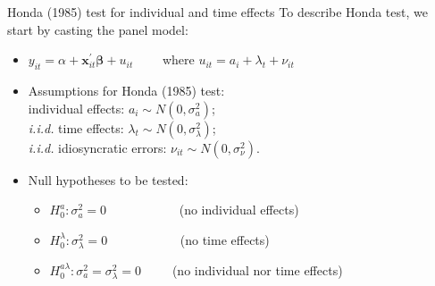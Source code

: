 \documentclass[usenames,dvipsnames]{beamer}
\begin{document}
\begin{frame}{Honda (1985) test for individual and time effects}
To describe Honda test, we start by casting the panel model: \\ \bigskip
\begin{itemize}
    \item $y_{it} = \alpha + \bm{x}^{\prime}_{it} \bm{\beta} + u_{it} \qquad$    where $u_{it}=a_i + \lambda_t + \nu_{it}$
    \bigskip
    \item Assumptions for Honda (1985) test: \\  individual effects: $a_i \sim N(0,\sigma^2_{a})$; \\{\it i.i.d.} time effects: $\lambda_t \sim N(0,\sigma^2_{\lambda})$; \\{\it i.i.d.} idiosyncratic errors: $\nu_{it} \sim N(0,\sigma^2_{\nu})$.
    \bigskip
    \item Null hypotheses to be tested:
    \medskip
    \begin{itemize}
        \item $H_0^{a}: \sigma^2_{a} = 0 \qquad \qquad$ ~~~(no individual effects)
        \smallskip
        \item $H_0^{\lambda}: \sigma^2_{\lambda} = 0 \qquad \qquad$ ~~~(no time effects)
        \smallskip
        \item $H_0^{a \lambda}: \sigma^2_{a} = \sigma^2_{\lambda} = 0 \qquad \,$ (no individual nor time effects)
    \end{itemize}
\end{itemize}
\end{frame}
\end{document}
